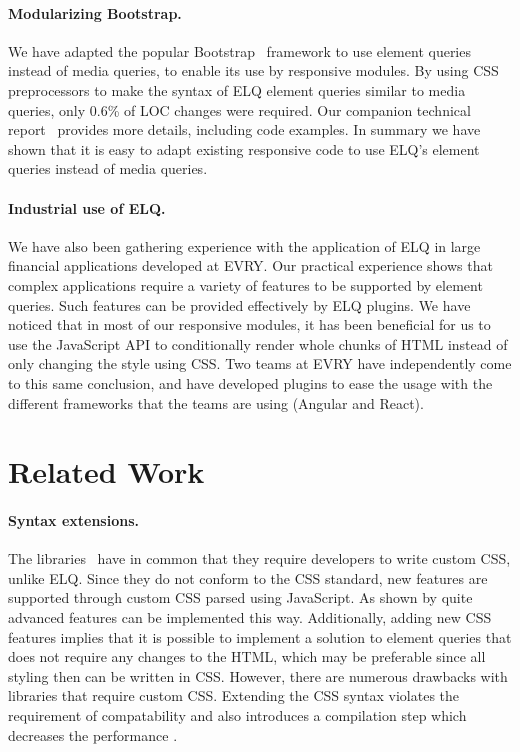 \documentclass[sigconf,9pt]{acmart}
\newcommand{\elq}{ELQ}
\begin{document}
    \paragraph{Modularizing Bootstrap.}
    We have adapted the popular Bootstrap~\cite{bootstrap} framework
    to use element queries instead of media queries, to enable its use
    by responsive modules. By using CSS preprocessors to make the
    syntax of \elq{} element queries similar to media queries, only
    0.6\% of LOC changes were required.
    Our companion technical report~\cite{WienerEH15} provides more details,
    including code examples.
    In summary we have shown that
    it is easy to adapt existing responsive code to use \elq{}'s
    element queries instead of media queries.

    \paragraph{Industrial use of \elq{}.}
    We have also been gathering experience with the application of
    \elq{} in large financial applications developed at EVRY.
    Our practical experience shows that complex applications
    require a variety of features to be supported by element queries.
    Such features can be provided effectively by \elq{} plugins.
    We have noticed that in most of our responsive modules, it has been beneficial for us to use the JavaScript API
    to conditionally render whole chunks of HTML instead of only changing the style using CSS.
    Two teams at EVRY have independently come to this same conclusion, and have developed plugins to ease the usage with the different frameworks that the teams are using (Angular and React).

\section{Related Work}\label{sec:related}

  \paragraph{Syntax extensions.}
  The libraries~\cite{eq_imp_magichtml,eq_imp_eqcss,eq_imp_prollyfill-min-width,eq_imp_localised-css,eq_imp_gss} have in common that they require developers to write custom CSS, unlike \elq{}.
  Since they do not conform to the CSS standard, new features are supported through custom CSS parsed using JavaScript.
  As shown by \cite{eq_imp_eqcss,eq_imp_gss} quite advanced features can be implemented this way.
  Additionally, adding new CSS features implies that it is possible to implement a solution to element queries that does not require any changes to the HTML, which may be preferable since all styling then can be written in CSS.
  However, there are numerous drawbacks with libraries that require custom CSS.
  Extending the CSS syntax violates the requirement of compatability and also introduces a compilation step which decreases the performance \cite{elq-thesis}.
\end{document}
